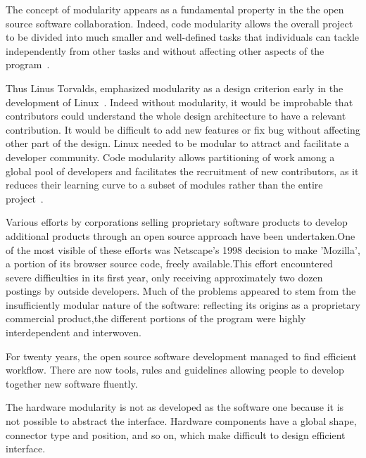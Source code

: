 The concept of modularity appears as a fundamental property in the the open source software collaboration. Indeed, code modularity allows the overall project to be divided into much smaller and well-defined tasks that individuals can tackle independently from other tasks and without affecting other aspects of the program~\parencite{narduzzo2008modularity}.

Thus Linus Torvalds, emphasized modularity as a design criterion early in the development of Linux~\parencite{dibona1999open}. Indeed without modularity, it would be improbable that contributors could understand the whole design architecture to have a relevant contribution. It would be difficult to add new features or fix bug without affecting other part of the design. Linux needed to be modular to attract and facilitate a developer community. Code modularity allows partitioning of work among a global pool of developers and facilitates the recruitment of new contributors, as it reduces their learning curve to a subset of modules rather than the entire project~\parencite{fitzgerald2004critical}.

Various efforts by corporations selling proprietary software products to develop additional products through an open source approach have been undertaken.One of the most visible of these efforts was Netscape's 1998 decision to make 'Mozilla', a portion of its browser source code, freely available.This effort encountered severe difficulties in its first year, only receiving approximately two dozen postings by outside developers. Much of the problems appeared to stem from the insufficiently modular nature of the software: reflecting its origins as a proprietary commercial product,the different portions of the program were highly interdependent and interwoven.

For twenty years, the open source software development managed to find efficient workflow. There are now tools, rules and guidelines allowing people to develop together new software fluently.

The hardware modularity is not as developed as the software one because it is not possible to abstract the interface. Hardware components have a global shape, connector type and position, and so on, which make difficult to design efficient interface.

\begin{figure}[tb]
\centering
    \hfil
     \\
    \caption{}
    \label{fig:hardware-modularity}
\end{figure}


